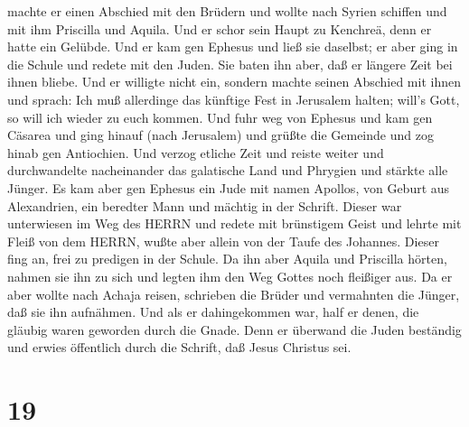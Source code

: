 machte er einen Abschied mit den Brüdern und wollte nach Syrien schiffen
und mit ihm Priscilla und Aquila. Und er schor sein Haupt zu Kenchreä,
denn er hatte ein Gelübde.  Und er kam gen Ephesus und ließ
sie daselbst; er aber ging in die Schule und redete mit den Juden.
 Sie baten ihn aber, daß er längere Zeit bei ihnen bliebe.
Und er willigte nicht ein,  sondern machte seinen Abschied
mit ihnen und sprach: Ich muß allerdinge das künftige Fest in Jerusalem
halten; will's Gott, so will ich wieder zu euch kommen. Und fuhr weg von
Ephesus  und kam gen Cäsarea und ging hinauf (nach
Jerusalem) und grüßte die Gemeinde und zog hinab gen Antiochien.
 Und verzog etliche Zeit und reiste weiter und
durchwandelte nacheinander das galatische Land und Phrygien und stärkte
alle Jünger.  Es kam aber gen Ephesus ein Jude mit namen
Apollos, von Geburt aus Alexandrien, ein beredter Mann und mächtig in
der Schrift.  Dieser war unterwiesen im Weg des HERRN und
redete mit brünstigem Geist und lehrte mit Fleiß von dem HERRN, wußte
aber allein von der Taufe des Johannes.  Dieser fing an,
frei zu predigen in der Schule. Da ihn aber Aquila und Priscilla hörten,
nahmen sie ihn zu sich und legten ihm den Weg Gottes noch fleißiger aus.
 Da er aber wollte nach Achaja reisen, schrieben die Brüder
und vermahnten die Jünger, daß sie ihn aufnähmen. Und als er
dahingekommen war, half er denen, die gläubig waren geworden durch die
Gnade.  Denn er überwand die Juden beständig und erwies
öffentlich durch die Schrift, daß Jesus Christus sei.

\hypertarget{section-18}{%
\section{19}\label{section-18}}

